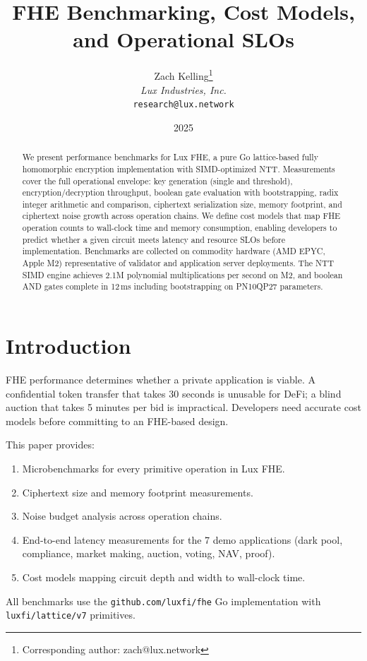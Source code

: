 \documentclass[11pt]{article}
\title{FHE Benchmarking, Cost Models, and Operational SLOs}
\author{
Zach Kelling\thanks{Corresponding author: zach@lux.network}\\
\textit{Lux Industries, Inc.}\\
\texttt{research@lux.network}
}
\date{2025}
\begin{document}
\luxcoverpage

\begin{abstract}
We present performance benchmarks for Lux FHE, a pure Go lattice-based fully homomorphic encryption implementation with SIMD-optimized NTT. Measurements cover the full operational envelope: key generation (single and threshold), encryption/decryption throughput, boolean gate evaluation with bootstrapping, radix integer arithmetic and comparison, ciphertext serialization size, memory footprint, and ciphertext noise growth across operation chains. We define cost models that map FHE operation counts to wall-clock time and memory consumption, enabling developers to predict whether a given circuit meets latency and resource SLOs before implementation. Benchmarks are collected on commodity hardware (AMD EPYC, Apple M2) representative of validator and application server deployments. The NTT SIMD engine achieves 2.1M polynomial multiplications per second on M2, and boolean AND gates complete in 12\,ms including bootstrapping on PN10QP27 parameters.
\end{abstract}

\section{Introduction}

FHE performance determines whether a private application is viable. A confidential token transfer that takes 30 seconds is unusable for DeFi; a blind auction that takes 5 minutes per bid is impractical. Developers need accurate cost models before committing to an FHE-based design.

This paper provides:
\begin{enumerate}
\item Microbenchmarks for every primitive operation in Lux FHE.
\item Ciphertext size and memory footprint measurements.
\item Noise budget analysis across operation chains.
\item End-to-end latency measurements for the 7 demo applications (dark pool, compliance, market making, auction, voting, NAV, proof).
\item Cost models mapping circuit depth and width to wall-clock time.
\end{enumerate}

All benchmarks use the \texttt{github.com/luxfi/fhe} Go implementation with \texttt{luxfi/lattice/v7} primitives.
\end{document}
